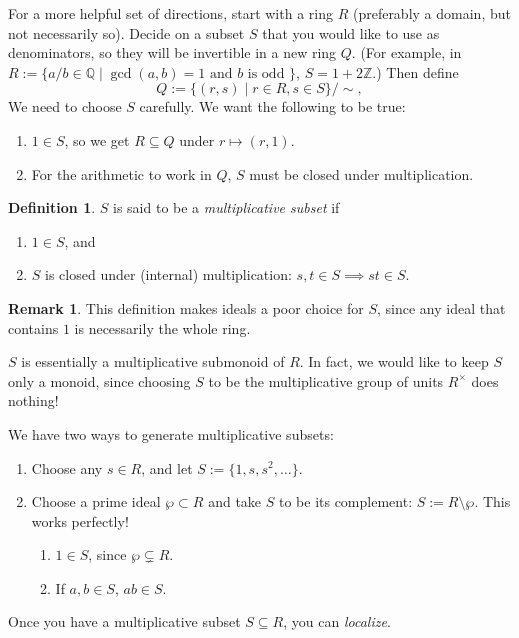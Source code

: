 \documentclass[12pt]{article}
\newcommand{\z}{\mathbb{Z}}
\newcommand{\q}{\mathbb{Q}}
\newcommand{\ita}[1]{\textit{#1}}
\theoremstyle{definition}
\newtheorem{definition}[theorem]{Definition}
\newtheorem*{remark}{Remark}
\begin{document}
For a more helpful set of directions, start with a ring $R$ (preferably a domain, but not necessarily so). Decide on a subset $S$ that you would like to use as denominators, so they will be invertible in a new ring $Q$. (For example, in $R:=\{a/b\in\q\mid\gcd(a,b)=1\text{ and }b\text{ is odd }\}$, $S=1+2\z$.) Then define
\begin{equation}
    Q:=\{(r,s)\mid r\in R,s\in S\}/\sim,
\end{equation}
We need to choose $S$ carefully. We want the following to be true:
\begin{enumerate}
    \item $1\in S$, so we get $R\subseteq Q$ under $r\mapsto(r,1)$.
    \item For the arithmetic to work in $Q$, $S$ must be closed under multiplication.
\end{enumerate}
\begin{definition}
    $S$ is said to be a \ita{multiplicative subset} if
    \begin{enumerate}
        \item $1\in S$, and
        \item $S$ is closed under (internal) multiplication: $s,t\in S\implies st\in S$.
    \end{enumerate}
\end{definition}
\begin{remark}
   This definition makes ideals a poor choice for $S$, since any ideal that contains $1$ is necessarily the whole ring.
   
   $S$ is essentially a multiplicative submonoid of $R$. In fact, we would like to keep $S$ only a monoid, since choosing $S$ to be the multiplicative group of units $R^{\times}$ does nothing!
\end{remark}
We have two ways to generate multiplicative subsets:
\begin{enumerate}
    \item Choose any $s\in R$, and let $S:=\{1,s,s^2,\dotsc\}$.
    \item Choose a prime ideal $\wp\subset R$ and take $S$ to be its complement: $S:=R\setminus\wp$. This works perfectly!
    \begin{enumerate}
        \item $1\in S$, since $\wp\subsetneq R$.
        \item If $a,b\in S$, $ab\in S$.
    \end{enumerate}
\end{enumerate}
Once you have a multiplicative subset $S\subseteq R$, you can \ita{localize}.
\end{document}
